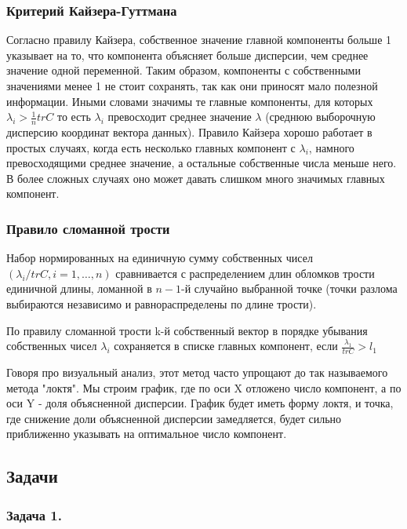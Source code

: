 \subsubsection{Критерий Кайзера-Гуттмана}
Согласно правилу Кайзера, собственное значение главной компоненты больше 1 указывает на то, что компонента объясняет больше дисперсии, чем среднее значение одной переменной. Таким образом, компоненты с собственными значениями менее 1 не стоит сохранять, так как они приносят мало полезной информации. Иными словами значимы те главные компоненты, для которых $\displaystyle \lambda _{i}>\frac {1}{n} tr C$ то есть
$\displaystyle \lambda _{i}$ превосходит среднее значение
$ \displaystyle \lambda$ (среднюю выборочную дисперсию координат вектора данных). Правило Кайзера хорошо работает в простых случаях, когда есть несколько главных компонент с
$\displaystyle \lambda _{i}$, намного превосходящими среднее значение, а остальные собственные числа меньше него. В более сложных случаях оно может давать слишком много значимых главных компонент.

\subsubsection{Правило сломанной трости}
Набор нормированных на единичную сумму собственных чисел $(\displaystyle \lambda_{i} / tr C, i = 1, \dots, n)$ сравнивается с распределением длин обломков трости единичной длины,
ломанной в $n - 1$-й случайно выбранной точке (точки разлома выбираются независимо и равнораспределены по длине трости).

По правилу сломанной трости k-й собственный вектор в порядке убывания собственных чисел $\lambda_{i}$ сохраняется в списке главных компонент, если $\frac {\lambda _{1}}{tr C} > l_{1}$

Говоря про визуальный анализ, этот метод часто упрощают до так называемого метода "локтя". Мы строим график, где по оси X отложено число компонент, а по оси Y - доля объясненной дисперсии. График будет иметь форму локтя, и точка, где снижение доли объясненной дисперсии замедляется, будет сильно приближенно указывать на оптимальное число компонент.

\subsection{Задачи}
\subsubsection*{Задача 1.}

